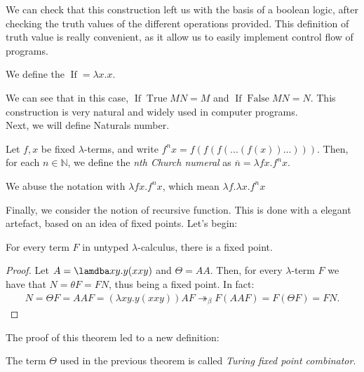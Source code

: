 We can check that this construction left us with the basis of a boolean logic, after checking the truth values of the different operations provided. This definition of truth value is really convenient, as it allow us to easily implement control flow of programs.

\begin{definition}
  We define the $\operatorname{If} = \lambda x.x$.  
\end{definition}

We can see that in this case, $\operatorname{If} \operatorname{True} M N = M$ and $\operatorname{If} \operatorname{False} M N = N$. This construction is very natural and widely used in computer programs.\\

Next, we will define Naturals number. 

\begin{definition} \label{def:untyped-natural} 
  Let $f,x$ be fixed $\lambda$-terms, and write $f^nx = f(f(f(...(f(x))...)))$. Then, for each $n \in \mathbb N$, we define the \emph{nth Church numeral} as $\overline n=\lambda f x.f^nx$.
\end{definition}
\begin{remark}
  We abuse the notation with $\lambda f x.f^nx$, which mean $\lambda f.\lambda x.f^nx$
\end{remark}

Finally, we consider the notion of recursive function. This is done with a elegant artefact, based on an idea of fixed points. Let's begin:



\begin{theorem}
  For every term $F$ in untyped $\lambda$-calculus, there is a fixed point.
\end{theorem}
\begin{proof}
  Let $A=\lamdba xy.y(xxy)$ and $\Theta =AA$. Then, for every $\lambda$-term $F$ we have that $N=\theta F = FN$, thus being a fixed point. In fact:
  \begin{align*}
    N = \Theta F = AAF = (\lambda xy.y(xxy))AF \twoheadrightarrow_\beta F(AAF) = F(\Theta F) = FN.
  \end{align*}
\end{proof}
The proof of this theorem led to a new definition:

\begin{definition}
  The term $\Theta$ used in the previous theorem is called \emph{Turing fixed point combinator}.
\end{definition}


